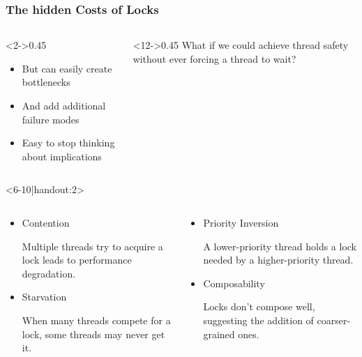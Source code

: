\documentclass[aspectratio=169,listings,handout]{beamer}
\def\rtem{\item[\faCaretRight]}
\begin{document}
\begin{frame}
	\frametitle{The hidden Costs of Locks}
	\begin{columns}[c]
		\begin{column}<2->{0.45\textwidth}
			\begin{block}
				\begin{itemize}[<+(2)->]
					\item But can easily create bottlenecks
					\item And add additional failure modes
					\rtem Easy to stop thinking about implications
				\end{itemize}
			\end{block}
		\end{column}
		\begin{column}<12->{0.45\textwidth}\centering
			What if we could achieve thread safety without ever forcing a thread to
			wait?\par\bigskip
			\scalebox{.7}{\begin{tikzpicture}
				\pingu[glow=accent,body type=chubby,wings wave,heart=blue,eyes wink,laptop left,laptop left mid={\tiny\color{black}Lock-free}]
			\end{tikzpicture}}
		\end{column}
	\end{columns}
	\begin{modal}<6-10|handout:2>
		\begin{columns}[c]
			\begin{column}{0.45\textwidth}
				\begin{itemize}\color{black}
					\item<7-> Contention\par{\small
						Multiple threads try to acquire a lock leads to performance
						degradation.}
					\item<8-> Starvation\par{\small
						When many threads compete for a lock, some threads may never get
						it.}
				\end{itemize}
			\end{column}
			\begin{column}{0.45\textwidth}\color{black}
				\begin{itemize}\color{black}
					\item<9-> Priority Inversion\par{\small
						A lower-priority thread holds a lock needed by a higher-priority
						thread.}
					\item<10-> Composability\par{\small
						Locks don't compose well, suggesting the addition of
						coarser-grained ones.}
				\end{itemize}
			\end{column}
		\end{columns}
	\end{modal}
\end{frame}
\end{document}
